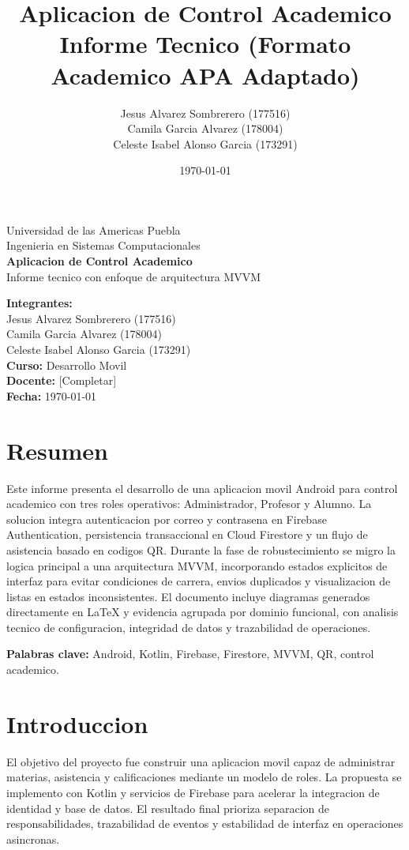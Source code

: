 \documentclass[12pt,a4paper]{article}
\title{Aplicacion de Control Academico\\Informe Tecnico (Formato Academico APA Adaptado)}
\author{%
Jesus Alvarez Sombrerero (177516)\\
Camila Garcia Alvarez (178004)\\
Celeste Isabel Alonso Garcia (173291)
}
\date{\today}
\begin{document}
\begin{titlepage}
    \centering
    \vspace*{2.5cm}
    {\Large Universidad de las Americas Puebla\\[0.4cm]}
    {\large Ingenieria en Sistemas Computacionales\\[1.8cm]}
    {\LARGE \textbf{Aplicacion de Control Academico}}\\[0.3cm]
    {\Large Informe tecnico con enfoque de arquitectura MVVM}\\[1.6cm]

    \begin{flushleft}
    \textbf{Integrantes:}\\
    Jesus Alvarez Sombrerero (177516)\\
    Camila Garcia Alvarez (178004)\\
    Celeste Isabel Alonso Garcia (173291)\\[0.7cm]
    \textbf{Curso:} Desarrollo Movil\\
    \textbf{Docente:} [Completar]\\
    \textbf{Fecha:} \today
    \end{flushleft}

    \vfill
\end{titlepage}

\section{Resumen}
Este informe presenta el desarrollo de una aplicacion movil Android para control academico con tres roles operativos: Administrador, Profesor y Alumno. La solucion integra autenticacion por correo y contrasena en Firebase Authentication, persistencia transaccional en Cloud Firestore y un flujo de asistencia basado en codigos QR. Durante la fase de robustecimiento se migro la logica principal a una arquitectura MVVM, incorporando estados explicitos de interfaz para evitar condiciones de carrera, envios duplicados y visualizacion de listas en estados inconsistentes. El documento incluye diagramas generados directamente en LaTeX y evidencia agrupada por dominio funcional, con analisis tecnico de configuracion, integridad de datos y trazabilidad de operaciones.

\textbf{Palabras clave:} Android, Kotlin, Firebase, Firestore, MVVM, QR, control academico.

\section{Introduccion}
El objetivo del proyecto fue construir una aplicacion movil capaz de administrar materias, asistencia y calificaciones mediante un modelo de roles. La propuesta se implemento con Kotlin y servicios de Firebase para acelerar la integracion de identidad y base de datos. El resultado final prioriza separacion de responsabilidades, trazabilidad de eventos y estabilidad de interfaz en operaciones asincronas.
\end{document}

